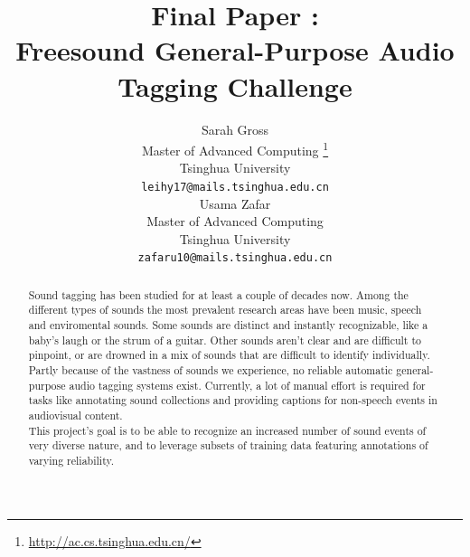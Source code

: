 \documentclass{article} %
\title{Final Paper : \\Freesound General-Purpose Audio Tagging Challenge}
\author{
Sarah Gross \\
Master of Advanced Computing \thanks{\url{http://ac.cs.tsinghua.edu.cn/}}\\
Tsinghua University\\
\texttt{leihy17@mails.tsinghua.edu.cn} \\
\And
Usama Zafar\\
Master of Advanced Computing\\
Tsinghua University\\
\texttt{zafaru10@mails.tsinghua.edu.cn} \\
}
\begin{document}
\maketitle

\begin{abstract}
	Sound tagging has been studied for at least a couple of decades now. Among the different types of sounds the most prevalent research areas have been music, speech and enviromental sounds. Some sounds are distinct and instantly recognizable, like a baby's laugh or the strum of a guitar. Other sounds aren't clear and are difficult to pinpoint, or are drowned in a mix of sounds that are difficult to identify individually.\\
	\newline
    Partly because of the vastness of sounds we experience, no reliable automatic general-purpose audio tagging systems exist. Currently, a lot of manual effort is required for tasks like annotating sound collections and providing captions for non-speech events in audiovisual content.\\
	\newline
    This project's goal is to be able to recognize an increased number of sound events of very diverse nature, and to leverage subsets of training data featuring annotations of varying reliability.
\end{abstract}
\end{document}

